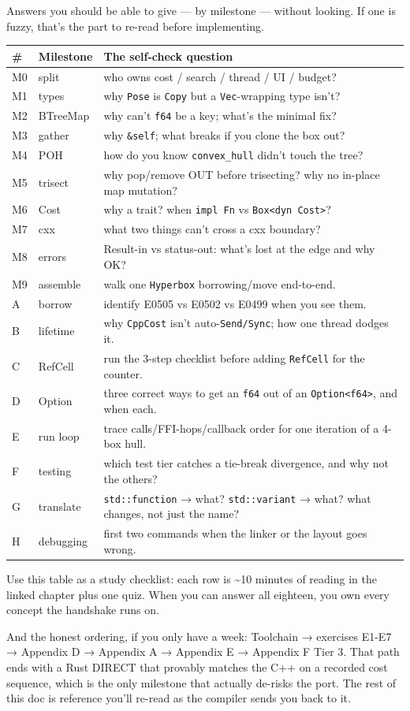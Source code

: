 \documentclass[11pt]{article}
\begin{document}
Answers you should be able to give — by milestone — without looking. If one is
fuzzy, that's the part to re-read before implementing.

\begin{center}
\begin{tabular}{lll}
\# & Milestone & The self-check question\\
\hline
M0 & split & who owns cost / search / thread / UI / budget?\\
M1 & types & why \texttt{Pose} is \texttt{Copy} but a \texttt{Vec}-wrapping type isn't?\\
M2 & BTreeMap & why can't \texttt{f64} be a key; what's the minimal fix?\\
M3 & gather & why \texttt{\&self}; what breaks if you clone the box out?\\
M4 & POH & how do you know \texttt{convex\_hull} didn't touch the tree?\\
M5 & trisect & why pop/remove OUT before trisecting? why no in-place map mutation?\\
M6 & Cost & why a trait? when \texttt{impl Fn} vs \texttt{Box<dyn Cost>}?\\
M7 & cxx & what two things can't cross a cxx boundary?\\
M8 & errors & Result-in vs status-out: what's lost at the edge and why OK?\\
M9 & assemble & walk one \texttt{Hyperbox} borrowing/move end-to-end.\\
A & borrow & identify E0505 vs E0502 vs E0499 when you see them.\\
B & lifetime & why \texttt{CppCost} isn't auto-\texttt{Send/Sync}; how one thread dodges it.\\
C & RefCell & run the 3-step checklist before adding \texttt{RefCell} for the counter.\\
D & Option & three correct ways to get an \texttt{f64} out of an \texttt{Option<f64>}, and when each.\\
E & run loop & trace calls/FFI-hops/callback order for one iteration of a 4-box hull.\\
F & testing & which test tier catches a tie-break divergence, and why not the others?\\
G & translate & \texttt{std::function} → what? \texttt{std::variant} → what? what changes, not just the name?\\
H & debugging & first two commands when the linker or the layout goes wrong.\\
\end{tabular}
\end{center}

Use this table as a study checklist: each row is \textasciitilde{}10 minutes of reading in the
linked chapter plus one quiz. When you can answer all eighteen, you own every
concept the handshake runs on.

And the honest ordering, if you only have a week: Toolchain → exercises E1-E7
→ Appendix D → Appendix A → Appendix E → Appendix F Tier 3. That path ends with
a Rust DIRECT that provably matches the C++ on a recorded cost sequence, which
is the only milestone that actually de-risks the port. The rest of this doc is
reference you'll re-read as the compiler sends you back to it.
\end{document}
